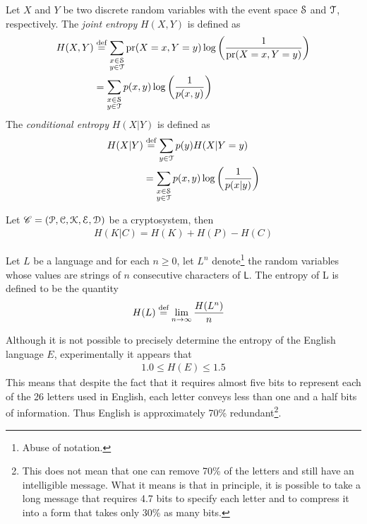 \documentclass[a4paper, 12pt]{book} %
\begin{document}
\begin{definition}
    Let $X$ and $Y$ be two discrete random variables with the event space $\EuScript{S}$ and $\EuScript{T}$, respectively. The \emph{joint entropy} $H(X, Y)$ is defined as
    \begin{align}
        H(X, Y) &\overset{\text{def}}{=} \sum_{ \substack{x \in \EuScript{S} \\ y \in \EuScript{T}}} \operatorname{pr}(X = x, Y = y) \log\bigg( \frac{1}{\operatorname{pr}(X = x, Y = y)}\bigg) \\
        &= \sum_{ \substack{x \in \EuScript{S} \\ y \in \EuScript{T}}} p(x, y) \log \bigg( \frac{1}{p(x, y)}\bigg)
    \end{align}
    The \emph{conditional entropy} $H(X|Y)$ is defined as 
    \begin{align}
        H(X|Y) &\overset{\text{def}}{=} \sum_{y \in \EuScript{T}} p(y)H(X|Y=y) \\
        &= \sum_{\substack{x \in \EuScript{S} \\ y \in \EuScript{T}}} p(x, y) \log \bigg( \frac{1}{p(x|y)}\bigg)
    \end{align}
\end{definition}


\begin{theorem}
    Let $\mathscr{C} = (\EuScript{P}, \EuScript{C}, \EuScript{K}, \EuScript{E}, \EuScript{D})$ be a cryptosystem, then 
    \begin{align}
        H(K|C) = H(K) + H(P) - H(C)
    \end{align}
\end{theorem}


\begin{definition}
    Let $L$ be a language and for each $n \geq 0$, let $L^n$ denote\footnote{Abuse of notation.} the random variables whose values are strings of $n$ consecutive characters of $\mathsf{L}$. The entropy of L is defined to be the quantity
\begin{align}
    H(L) &\overset{\text{def}}{=} \lim_{n \rightarrow \infty} \frac{H(L^n)}{n}
\end{align}
\cite{silverman2008introduction}
\end{definition}

Although it is not possible to precisely determine the entropy of the English language $E$, experimentally it appears that
\begin{align}
    1.0 \leq H(E) \leq 1.5
\end{align}
This means that despite the fact that it requires almost five bits to represent each of the 26 letters used in English, each letter conveys less than one and a half bits of information. Thus English is approximately 70\% redundant\footnote{This does not mean that one can remove 70\% of the letters and still have an intelligible message. What it means is that in principle, it is possible to take a long message that requires 4.7 bits to specify each letter and to compress it into a form that takes only 30\% as many bits.}.
\end{document}
